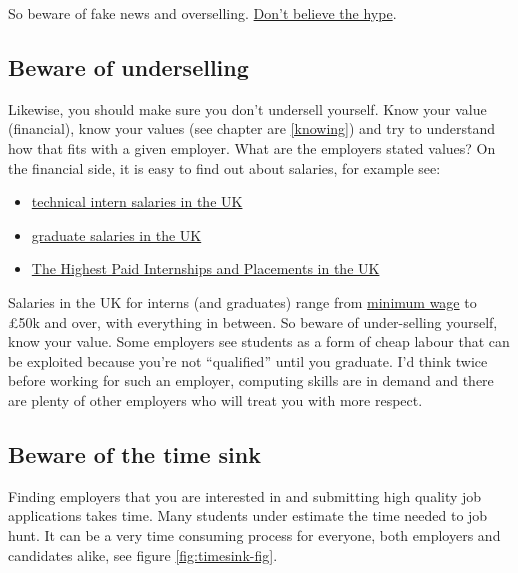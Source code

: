 \documentclass[
]{book}
\providecommand{\tightlist}{%
  \setlength{\itemsep}{0pt}\setlength{\parskip}{0pt}}
\begin{document}
So beware of fake news and overselling. \href{https://en.wikipedia.org/wiki/Don\%27t_Believe_the_Hype}{Don't believe the hype}. \citep{dontbelievethehype}

\hypertarget{undersell}{%
\subsection{Beware of underselling}\label{undersell}}

Likewise, you should make sure you don't undersell yourself. Know your value (financial), know your values (see chapter are \ref{knowing}) and try to understand how that fits with a given employer. What are the employers stated values? On the financial side, it is easy to find out about salaries, for example see:

\begin{itemize}
\tightlist
\item
  \href{https://github.com/IgWod/interns-salaries-uk-2018}{technical intern salaries in the UK} \citep{igwod}
\item
  \href{https://luminate.prospects.ac.uk/graduate-salaries-in-the-uk}{graduate salaries in the UK} \citep{michaelgrove}
\item
  \href{https://www.ratemyplacement.co.uk/blog/highest-paid-internships-placements-uk/}{The Highest Paid Internships and Placements in the UK} \citep{louiseintern}
\end{itemize}

Salaries in the UK for interns (and graduates) range from \href{https://www.gov.uk/national-minimum-wage}{minimum wage} to £50k and over, with everything in between. So beware of under-selling yourself, know your value. Some employers see students as a form of cheap labour that can be exploited because you're not ``qualified'' until you graduate. I'd think twice before working for such an employer, computing skills are in demand and there are plenty of other employers who will treat you with more respect.

\hypertarget{timesink}{%
\subsection{Beware of the time sink}\label{timesink}}

Finding employers that you are interested in and submitting high quality job applications takes time. Many students under estimate the time needed to job hunt. It can be a very time consuming process for everyone, both employers and candidates alike, see figure \ref{fig:timesink-fig}.
\end{document}
